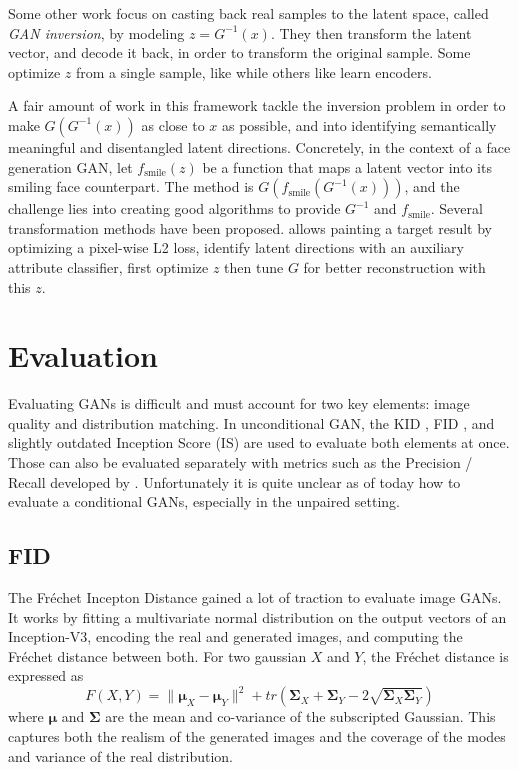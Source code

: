 Some other work focus on casting back real samples to the latent space, called \emph{GAN inversion}, by modeling $z=G^{-1}(x)$. They then transform the latent vector, and decode it back, in order to transform the original sample. Some optimize $z$ from a single sample, like \citet{inverting} while others like \citet{collaborativeembedding} learn encoders.

A fair amount of work in this framework tackle the inversion problem in order to make $G(G^{-1}(x))$ as close to $x$ as possible, and into identifying semantically meaningful and disentangled latent directions. Concretely, in the context of a face generation GAN, let $f_\text{smile}(z)$ be a function that maps a latent vector into its smiling face counterpart. The method is $G(f_\text{smile}(G^{-1}(x)))$, and the challenge lies into creating good algorithms to provide $G^{-1}$ and $f_\text{smile}$. Several transformation methods have been proposed. \citet{neuralphotoeditor} allows painting a target result by optimizing a pixel-wise L2 loss, \citet{interfacegan} identify latent directions with an auxiliary attribute classifier, \citet{pivotaltuning} first optimize $z$ then tune $G$ for better reconstruction with this $z$.

\section{Evaluation}

Evaluating GANs is difficult and must account for two key elements: image quality and distribution matching. In unconditional \ac{GAN}, the \ac{KID} \citep{kid}, \ac{FID} \citep{fid}, and slightly outdated Inception Score (IS) \citep{inceptionscore} are used to evaluate both elements at once. Those can also be evaluated separately with metrics such as the  Precision / Recall developed by \citet{precisionrecall}. Unfortunately it is quite unclear as of today how to evaluate a conditional \acp{GAN}, especially in the unpaired setting.

\subsection{FID}

The Fréchet Incepton Distance gained a lot of traction to evaluate image GANs. It works by fitting a multivariate normal distribution on the output vectors of an Inception-V3, encoding the real and generated images, and computing the Fréchet distance \citep{frechet} between both. For two gaussian $X$ and $Y$, the Fréchet distance is expressed as
\begin{equation*}
    F(X,Y) = \|\mathbf{\mu}_X - \mathbf{\mu}_Y\|^2 + tr\left(\mathbf{\Sigma}_X + \mathbf{\Sigma}_Y - 2\sqrt{\mathbf{\Sigma}_X\mathbf{\Sigma}_Y}\right)
\end{equation*}
where $\mathbf{\mu}$ and $\mathbf{\Sigma}$ are the mean and co-variance of the subscripted Gaussian.
This captures both the realism of the generated images and the coverage of the modes and variance of the real distribution.

